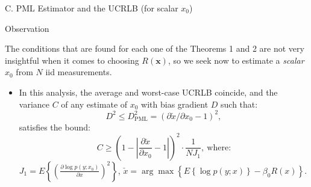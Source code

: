 \documentclass{beamer}
\begin{document}
\begin{frame}{C. PML Estimator and the UCRLB (for scalar $x_0$)}
\begin{block}{Observation}
\begin{center}
The conditions that are found for each one of the Theorems 1 and 2 are not very insightful when it comes to choosing $R(\mathbf{x})$, so we seek now to estimate a \textit{scalar} \( x_0 \) from \( N \) iid measurements.
\end{center}
\end{block}

\begin{itemize}
    \item In this analysis, the average and worst-case UCRLB coincide, and the variance $C$ of any estimate of $x_0$ with bias gradient $D$ such that:
    \begin{equation*}
        D^2 \leq D_{\text{PML}}^2 = \left(\partial \check{x} / \partial x_0 - 1\right)^2,
    \end{equation*}
    satisfies the bound:
    \begin{equation*}
        C \geq \left(1 - \left| \frac{\partial \check{x}}{\partial x_0} - 1 \right| \right)^2 \cdot \frac{1}{N J_1}, \ \text{where:}
    \end{equation*}
    $J_1 = E \left\{ \left( \frac{\partial \log p(y; x_0)}{\partial x} \right)^2 \right\}$, $\check{x} = \arg\max \left\{ E\left\{\log p(y; x)\right\} - \beta_0 R(x) \right\}$.
\end{itemize}

\end{frame}
\end{document}

